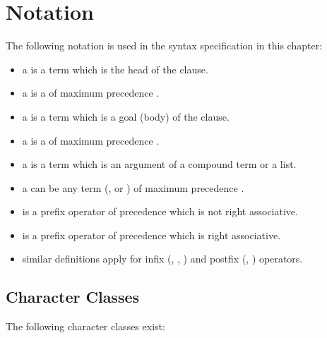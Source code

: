 \section{Notation}
The following notation is used in the syntax specification in this chapter:
\begin{itemize}
\item a  is a term which is the head of the clause.
\item a  is a  of maximum
  precedence .
\item a  is a term which is a goal (body) of the clause.
\item a  is a  of maximum
  precedence .
\item a  is a term which is an argument of a compound term or
  a list.
\item a  can be any term (,
   or )
  of maximum precedence .
\item {} is a prefix operator of precedence  which is not
  right associative.
\item {} is a prefix operator of precedence  which is
  right
  associative.
\item similar definitions apply for infix (, ,
  ) and postfix (, ) operators.
\end{itemize}

\subsection{Character Classes}
\label{charclass}

The following character classes exist:
\vspace{0.3cm}

